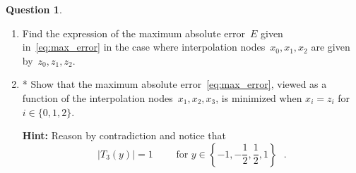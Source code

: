 \documentclass[11pt]{article}
\theoremstyle{definition}
\newtheorem{question}{Question}
\theoremstyle{remark}
\theoremstyle{plain}%
\begin{document}
\begin{question}
\begin{enumerate}
        \item
            Find the expression of the maximum absolute error~$E$ given in~\eqref{eq:max_error}
            in the case where interpolation nodes~$x_0, x_1, x_2$ are given by~$z_0, z_1, z_2$.

        \item
            *
            Show that the maximum absolute error~\eqref{eq:max_error},
            viewed as a function of the interpolation nodes~$x_1, x_2, x_3$,
            is minimized when $x_i = z_i$ for $i \in \{0, 1, 2\}$.

            \textbf{Hint:} Reason by contradiction and notice that
            \[
                \bigl\lvert T_3(y) \bigr\rvert = 1
                \qquad \text{ for $y \in \left\{-1, -\frac{1}{2}, \frac{1}{2}, 1 \right\}$  }.
            \]
    \end{enumerate}
\end{question}
\end{document}

